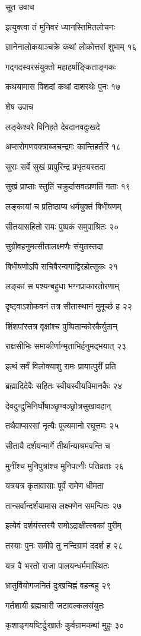 सूत उवाच

इत्युक्त्वा तं मुनिवरं ध्यानस्तिमितलोचनः

ज्ञानेनालोकयाञ्चक्रे कथां लोकोत्तरां शुभाम् १६

गद्गदस्वरसंयुक्तो महाहर्षाङ्किताङ्गकः

कथयामास विशदां कथां दाशरथेः पुनः १७

शेष उवाच

लङ्केश्वरे विनिहते देवदानवदुःखदे

अप्सरोगणवक्त्राब्जचन्द्रमः कान्तिहर्तरि १८

सुराः सर्वे सुखं प्रापुरिन्द्र प्रभृतयस्तदा

सुखं प्राप्ताः स्तुतिं चक्रुर्दासवत्प्रणतिं गताः १९

लङ्कायां च प्रतिष्ठाप्य धर्मयुक्तं बिभीषणम्

सीतयासहितो रामः पुष्पकं समुपाश्रितः २०

सुग्रीवहनुमत्सीतालक्ष्मणैः संयुतस्तदा

बिभीषणोऽपि सचिवैरन्वगाद्विरहोत्सुकः २१

लङ्कां स पश्यन्बहुधा भग्नप्राकारतोरणाम्

दृष्ट्वाऽशोकवनं तत्र सीतास्थानं मुमूर्च्छ ह २२

शिंशपांस्तत्र वृक्षांश्च पुष्पितान्कोरकैर्युतान्

राक्षसीभिः समाकीर्णान्मृताभिर्हनुमद्भयात् २३

इत्थं सर्वं विलोक्याशु रामः प्रायात्पुरीं प्रति

ब्रह्मादिदेवैः सहितः स्वीयस्वीयविमानकैः २४

देवदुन्दुभिनिर्घोषाञ्छृण्वञ्छ्रोत्रसुखावहान्

तथैवाप्सरसां नृत्यैः पूज्यमानो रघूत्तमः २५

सीतायै दर्शयन्मार्गे तीर्थान्याश्रमवन्ति च

मुनींश्च मुनिपुत्रांश्च मुनिपत्नीः पतिव्रताः २६

यत्रयत्र कृतावासाः पूर्वं रामेण धीमता

तान्सर्वान्दर्शयामास लक्ष्मणेन समन्वितः २७

इत्येवं दर्शयंस्तस्यै रामोऽद्राक्षीत्स्वकां पुरीम्

तस्याः पुनः समीपे तु नन्दिग्रामं ददर्श ह २८

यत्र वै भरतो राजा पालयन्धर्ममास्थितः

भ्रातुर्वियोगजनितं दुःखचिह्नं वहन्बहु २९

गर्तशायी ब्रह्मचारी जटावल्कलसंयुतः

कृशाङ्गयष्टिर्दुःखार्तः कुर्वन्रामकथां मुहुः ३०

